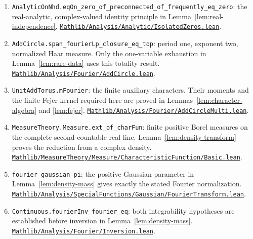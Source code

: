 \documentclass[reqno,a4paper,12pt]{amsart}
\theoremstyle{definition}
\newcommand{\ml}[1]{\nolinkurl{#1}}
\begin{document}
\begin{enumerate}
\href{https://github.com/leanprover-community/mathlib4/blob/1ddfaa9548e05b343be9248ae08b73c3425b446e/Mathlib/LinearAlgebra/LinearIndependent/Basic.lean#L516}{\ml{Mathlib/LinearAlgebra/LinearIndependent/Basic.lean}}.
\item \ml{AnalyticOnNhd.eqOn_zero_of_preconnected_of_frequently_eq_zero}: the real-analytic, complex-valued identity principle in Lemma~\ref{lem:real-independence}.
\href{https://github.com/leanprover-community/mathlib4/blob/1ddfaa9548e05b343be9248ae08b73c3425b446e/Mathlib/Analysis/Analytic/IsolatedZeros.lean#L210}{\ml{Mathlib/Analysis/Analytic/IsolatedZeros.lean}}.
\item \ml{AddCircle.span_fourierLp_closure_eq_top}: period one, exponent two, normalized Haar measure. Only the one-variable exhaustion in Lemma~\ref{lem:rare-data} uses this totality result.
\href{https://github.com/leanprover-community/mathlib4/blob/1ddfaa9548e05b343be9248ae08b73c3425b446e/Mathlib/Analysis/Fourier/AddCircle.lean#L259}{\ml{Mathlib/Analysis/Fourier/AddCircle.lean}}.
\item \ml{UnitAddTorus.mFourier}: the finite auxiliary characters. Their moments and the finite Fejer kernel required here are proved in Lemmas~\ref{lem:character-algebra} and \ref{lem:fejer}.
\href{https://github.com/leanprover-community/mathlib4/blob/1ddfaa9548e05b343be9248ae08b73c3425b446e/Mathlib/Analysis/Fourier/AddCircleMulti.lean#L53}{\ml{Mathlib/Analysis/Fourier/AddCircleMulti.lean}}.
\item \ml{MeasureTheory.Measure.ext_of_charFun}: finite positive Borel measures on the complete second-countable real line. Lemma~\ref{lem:density-transform} proves the reduction from a complex density.
\href{https://github.com/leanprover-community/mathlib4/blob/1ddfaa9548e05b343be9248ae08b73c3425b446e/Mathlib/MeasureTheory/Measure/CharacteristicFunction/Basic.lean#L256}{\ml{Mathlib/MeasureTheory/Measure/CharacteristicFunction/Basic.lean}}.
\item \ml{fourier_gaussian_pi}: the positive Gaussian parameter in Lemma~\ref{lem:density-mass} gives exactly the stated Fourier normalization.
\href{https://github.com/leanprover-community/mathlib4/blob/1ddfaa9548e05b343be9248ae08b73c3425b446e/Mathlib/Analysis/SpecialFunctions/Gaussian/FourierTransform.lean#L227}{\ml{Mathlib/Analysis/SpecialFunctions/Gaussian/FourierTransform.lean}}.
\item \ml{Continuous.fourierInv_fourier_eq}: both integrability hypotheses are established before inversion in Lemma~\ref{lem:density-mass}.
\href{https://github.com/leanprover-community/mathlib4/blob/1ddfaa9548e05b343be9248ae08b73c3425b446e/Mathlib/Analysis/Fourier/Inversion.lean#L175}{\ml{Mathlib/Analysis/Fourier/Inversion.lean}}.

\end{enumerate}
\end{document}
